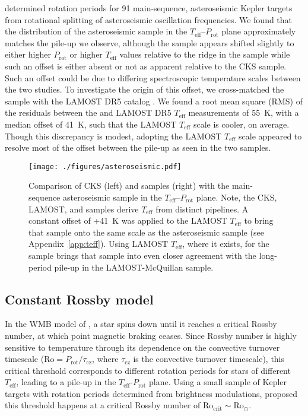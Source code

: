 \documentclass[trackchanges,twocolumn]{aastex631}
\newcommand{\lamostmcq}{LAMOST--McQuillan\xspace}
\newcommand{\teff}{\ensuremath{T_{\mathrm{eff}}}\xspace}
\newcommand{\prot}{\ensuremath{P_\mathrm{rot}}\xspace}
\begin{document}
\citet{Hall2021} determined rotation periods for 91 main-sequence, asteroseismic Kepler targets from rotational splitting of asteroseismic oscillation frequencies. We found that the distribution of the asteroseismic sample in the \teff--\prot plane approximately matches the pile-up we observe, although the \citet{Hall2021} sample appears shifted slightly to either higher \prot or higher \teff values relative to the ridge in the \edit1{\lamostmcq} sample while such an offset is either absent or not as apparent relative to the CKS sample. Such an offset could be due to differing spectroscopic temperature scales between the two studies. To investigate the origin of this offset, we cross-matched the \citet{Hall2021} sample with the LAMOST DR5 catalog \citep{Xiang2019}. We found a root mean square (RMS) of the residuals between the \citet{Hall2021} and LAMOST DR5 \teff measurements of 55~K, with a median offset of 41~K, such that the LAMOST \teff scale is cooler, on average. Though this discrepancy is modest, adopting the LAMOST \teff scale appeared to resolve most of the offset between the pile-up as seen in the two samples. 

\begin{figure}
    \centering
    \texttt{[image: ./figures/asteroseismic.pdf]}
    \caption{Comparison of CKS (left) and \edit1{\lamostmcq} samples (right) with the \citet{Hall2021} main-sequence asteroseismic sample in the \teff--\prot plane. Note, the CKS, LAMOST, and \citet{Hall2021} samples derive \teff from distinct pipelines. A constant offset of +41~K was applied to the LAMOST \teff to bring that sample onto the same scale as the asteroseismic sample (see Appendix~\ref{app:teff}). Using LAMOST \teff, where it exists, for the \citet{Hall2021} sample brings that sample into even closer agreement with the long-period pile-up in the LAMOST-McQuillan sample.}
    \label{fig:asteroseismic}
\end{figure}

\subsection{Constant Rossby model}
\label{subsec:rossby}
In the WMB model of \citet{vanSaders2016, vanSaders2019}, a star spins down until it reaches a critical Rossby number, at which point magnetic braking ceases. Since Rossby number is highly sensitive to temperature through its dependence on the convective turnover timescale ($\mathrm{Ro} = P_\mathrm{rot}/\tau_\mathrm{cz}$, where $\tau_\mathrm{cz}$ is the convective turnover timescale), this critical threshold corresponds to different rotation periods for stars of different \teff, leading to a pile-up in the \teff-\prot plane. Using a small sample of Kepler targets with rotation periods determined from brightness modulations, \citet{vanSaders2016} proposed this threshold happens at a critical Rossby number of $\mathrm{Ro_{crit}} \sim \mathrm{Ro_\odot}$. 
\end{document}
